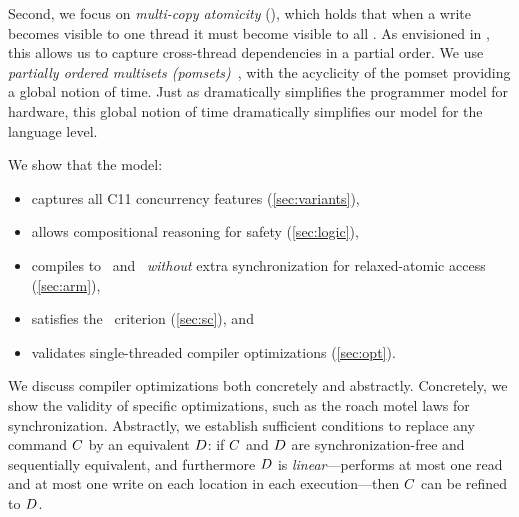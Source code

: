 Second, we focus on \emph{multi-copy atomicity} (\mca), which holds that when a write becomes visible to one thread it must become visible to all \citep{DBLP:journals/pacmpl/PulteFDFSS18}.  As envisioned in \cite[]{AlglaveThesis},  this allows us to capture cross-thread dependencies  in a partial order.  We use \emph{partially ordered multisets (pomsets)}~\citep{GISCHER1988199,Plotkin:1997:TSP:266557.266600}, with the acyclicity of the pomset providing a global notion of time.  
Just as \mca{} dramatically simplifies the programmer model for hardware, %
this global notion of time dramatically simplifies our model for the language level.

We show that the model:
\begin{itemize}
\item captures all C11 concurrency features  %
  (\textsection\ref{sec:variants}),

\item allows compositional reasoning for safety %
  (\textsection\ref{sec:logic}),

\item compiles to \armeight\ and \tso\ {\em without} extra synchronization for relaxed-atomic access (\textsection\ref{sec:arm}),

\item  satisfies the \drfsc\ criterion  (\textsection\ref{sec:sc}), and

\item validates single-threaded compiler optimizations
  (\textsection\ref{sec:opt}).

\end{itemize}

We discuss compiler optimizations both concretely and abstractly.
Concretely, we show the validity of specific optimizations, such as the roach motel laws for synchronization.
Abstractly, we establish sufficient conditions to replace any command $C$ by an equivalent $D$: if
$C$ and $D$ are synchronization\hyp{}free and sequentially equivalent, and furthermore $D$ is \emph{linear}---performs at most one read and at most one write on each location in each execution---then $C$ can be refined to $D$.  

